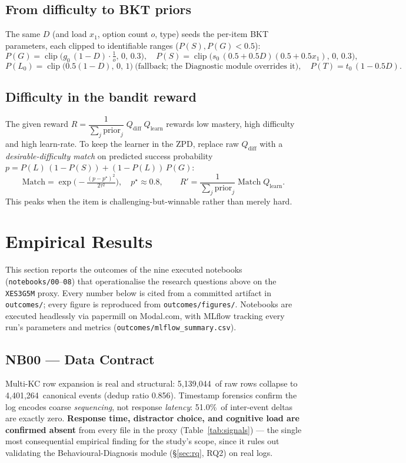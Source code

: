 \documentclass[11pt]{article}
\begin{document}
\subsection{From difficulty to BKT priors}\label{sec:priors}
The same $D$ (and load $x_1$, option count $o$, type) seeds the per-item BKT parameters, each clipped to identifiable ranges ($P(S),P(G)<0.5$):
\[
P(G)=\operatorname{clip}\!\big(g_0\,(1-D)\cdot \tfrac{1}{o},\,0,\,0.3\big),\quad
P(S)=\operatorname{clip}\!\big(s_0\,(0.5+0.5D)(0.5+0.5x_1),\,0,\,0.3\big),
\]
\[
P(L_0)=\operatorname{clip}\!\big(0.5(1-D),\,0,\,1\big)\ \text{(fallback; the Diagnostic module overrides it)},\quad
P(T)=t_0\,(1-0.5D).
\]

\subsection{Difficulty in the bandit reward}\label{sec:reward}
The given reward $R=\dfrac{1}{\sum_j \text{prior}_j}\;Q_{\text{diff}}\;Q_{\text{learn}}$ rewards low mastery, high difficulty and high learn-rate. To keep the learner in the ZPD, replace raw $Q_{\text{diff}}$ with a \emph{desirable-difficulty match} on predicted success probability
\(p=P(L)\,(1-P(S))+(1-P(L))\,P(G)\):
\[
\text{Match}=\exp\!\Big(-\tfrac{(p-p^\star)^2}{2\tau^2}\Big),\quad p^\star\approx0.8,\qquad
R' = \frac{1}{\sum_j \text{prior}_j}\;\text{Match}\;Q_{\text{learn}} .
\]
This peaks when the item is challenging-but-winnable rather than merely hard.

\section{Empirical Results}\label{sec:results}
This section reports the outcomes of the nine executed notebooks (\texttt{notebooks/00}--\texttt{08}) that operationalise the research questions above on the \texttt{XES3G5M} proxy. Every number below is cited from a committed artifact in \texttt{outcomes/}; every figure is reproduced from \texttt{outcomes/figures/}. Notebooks are executed headlessly via papermill on Modal.com, with MLflow tracking every run's parameters and metrics (\texttt{outcomes/mlflow\_summary.csv}).

\subsection{NB00 --- Data Contract}
Multi-KC row expansion is real and structural: 5{,}139{,}044\ of raw rows collapse to 4{,}401{,}264\ canonical events (dedup ratio 0.856). Timestamp forensics confirm the log encodes coarse \emph{sequencing}, not response \emph{latency}: 51.0\%\ of inter-event deltas are exactly zero. \textbf{Response time, distractor choice, and cognitive load are confirmed absent} from every file in the proxy (Table~\ref{tab:signals}) --- the single most consequential empirical finding for the study's scope, since it rules out validating the Behavioural-Diagnosis module (\S\ref{sec:rq}, RQ2) on real logs.
\end{document}

